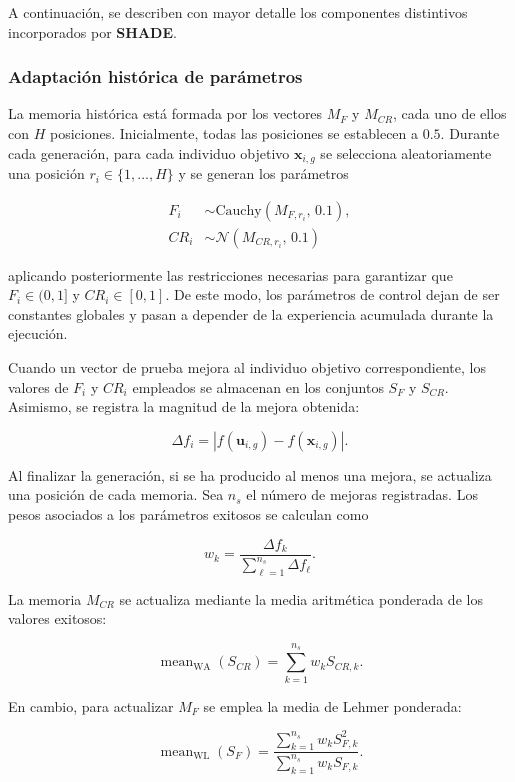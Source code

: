 A continuación, se describen con mayor detalle los componentes distintivos incorporados por \textbf{SHADE}.


\subsubsection{Adaptación histórica de parámetros}

La memoria histórica está formada por los vectores \(M_F\) y \(M_{CR}\), cada uno de ellos con \(H\) posiciones. Inicialmente, todas las posiciones se establecen a \(0.5\). Durante cada generación, para cada individuo objetivo \(\mathbf{x}_{i,g}\) se selecciona aleatoriamente una posición \(r_i \in \{1,\dots,H\}\) y se generan los parámetros

\begin{align*}
    F_i  & \sim \mathrm{Cauchy}(M_{F,r_i},\,0.1), \\
    CR_i & \sim \mathcal{N}(M_{CR,r_i},\,0.1)
\end{align*}

aplicando posteriormente las restricciones necesarias para garantizar que \(F_i \in (0,1]\) y \(CR_i \in [0,1]\). De este modo, los parámetros de control dejan de ser constantes globales y pasan a depender de la experiencia acumulada durante la ejecución.

Cuando un vector de prueba mejora al individuo objetivo correspondiente, los valores de \(F_i\) y \(CR_i\) empleados se almacenan en los conjuntos \(S_F\) y \(S_{CR}\). Asimismo, se registra la magnitud de la mejora obtenida:

\[
    \Delta f_i
    =
    \left|
    f(\mathbf{u}_{i,g})
    -
    f(\mathbf{x}_{i,g})
    \right|.
\]

Al finalizar la generación, si se ha producido al menos una mejora, se actualiza una posición de cada memoria. Sea \(n_s\) el número de mejoras registradas. Los pesos asociados a los parámetros exitosos se calculan como

\[
    w_k
    =
    \frac{
        \Delta f_k
    }{
        \displaystyle\sum_{\ell=1}^{n_s} \Delta f_\ell
    }.
\]

La memoria \(M_{CR}\) se actualiza mediante la media aritmética ponderada de los valores exitosos:

\[
    \operatorname{mean}_{\mathrm{WA}}(S_{CR})
    =
    \sum_{k=1}^{n_s} w_k S_{CR,k}.
\]

En cambio, para actualizar \(M_F\) se emplea la media de Lehmer ponderada:

\[
    \operatorname{mean}_{\mathrm{WL}}(S_F)
    =
    \frac{
        \displaystyle\sum_{k=1}^{n_s} w_k S_{F,k}^2
    }{
        \displaystyle\sum_{k=1}^{n_s} w_k S_{F,k}
    }.
\]

